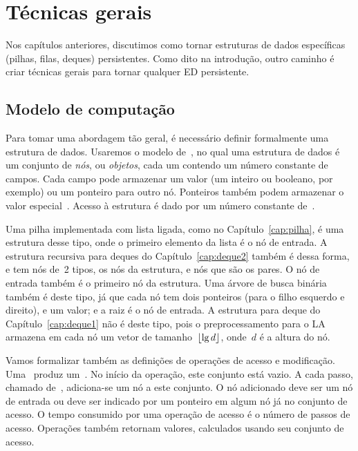 \documentclass[../../main.tex]{subfiles}
\begin{document}
\chapter{Técnicas gerais} \label{cap:geral}

Nos capítulos anteriores, discutimos como tornar estruturas de dados específicas (pilhas, filas, deques) persistentes. Como dito na introdução, outro caminho é criar técnicas gerais para tornar qualquer ED persistente.


\section{Modelo de computação}

Para tomar uma abordagem tão geral, é necessário definir formalmente uma estrutura de dados.  Usaremos o modelo de~, no qual uma estrutura de dados é um conjunto de \emph{nós}, ou \emph{objetos}, cada um contendo um número constante de campos. Cada campo pode armazenar um valor (um inteiro ou booleano, por exemplo) ou um ponteiro para outro nó. Ponteiros também podem armazenar o valor especial~.  Acesso à estrutura é dado por um número constante de~.


Uma pilha implementada com lista ligada, como no Capítulo~\ref{cap:pilha}, é uma estrutura desse tipo, onde o primeiro elemento da lista é o nó de entrada. A estrutura recursiva para deques do Capítulo~\ref{cap:deque2} também é dessa forma, e tem nós de~2 tipos, os nós da estrutura, e nós que são os pares. O nó de entrada também é o primeiro nó da estrutura.  Uma árvore de busca binária também é deste tipo, já que cada nó tem dois ponteiros (para o filho esquerdo e direito), e um valor; e a raiz é o nó de entrada.  A estrutura para deque do Capítulo~\ref{cap:deque1} não é deste tipo, pois o preprocessamento para o LA armazena em cada nó um vetor de tamanho~$\lfloor\lg d\rfloor$, onde~$d$ é a altura do nó.

Vamos formalizar também as definições de operações de acesso e modificação. Uma~ produz um~. No início da operação, este conjunto está vazio.  A cada passo, chamado de~, adiciona-se um nó a este conjunto. O nó adicionado deve ser um nó de entrada ou deve ser indicado por um ponteiro em algum nó já no conjunto de acesso. O tempo consumido por uma operação de acesso é o número de passos de acesso. Operações também retornam valores, calculados usando seu conjunto de acesso.
\end{document}
